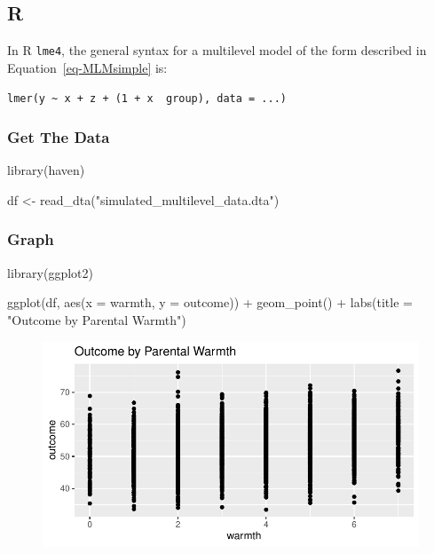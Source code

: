 \documentclass[
  letterpaper,
  DIV=11,
  numbers=noendperiod,
  oneside]{scrreprt}
\newenvironment{Shaded}{\begin{snugshade}}{\end{snugshade}}
\newcommand{\AttributeTok}[1]{\textcolor[rgb]{0.40,0.45,0.13}{#1}}
\newcommand{\FunctionTok}[1]{\textcolor[rgb]{0.28,0.35,0.67}{#1}}
\newcommand{\NormalTok}[1]{\textcolor[rgb]{0.00,0.23,0.31}{#1}}
\newcommand{\OtherTok}[1]{\textcolor[rgb]{0.00,0.23,0.31}{#1}}
\newcommand{\SpecialCharTok}[1]{\textcolor[rgb]{0.37,0.37,0.37}{#1}}
\newcommand{\StringTok}[1]{\textcolor[rgb]{0.13,0.47,0.30}{#1}}
\begin{document}
\subsection{R}

In R \texttt{lme4}, the general syntax for a multilevel model of the
form described in Equation~\ref{eq-MLMsimple} is:

\texttt{lmer(y\ \textasciitilde{}\ x\ +\ z\ +\ (1\ +\ x\ \textbar{}\textbar{}\ group),\ data\ =\ ...)}

\hypertarget{get-the-data-1}{%
\subsubsection{Get The Data}\label{get-the-data-1}}

\begin{Shaded}
\begin{Highlighting}[]
\FunctionTok{library}\NormalTok{(haven)}

\NormalTok{df }\OtherTok{\textless{}{-}} \FunctionTok{read\_dta}\NormalTok{(}\StringTok{"simulated\_multilevel\_data.dta"}\NormalTok{)}
\end{Highlighting}
\end{Shaded}

\hypertarget{graph-1}{%
\subsubsection{Graph}\label{graph-1}}

\begin{Shaded}
\begin{Highlighting}[]
\FunctionTok{library}\NormalTok{(ggplot2)}

\FunctionTok{ggplot}\NormalTok{(df,}
       \FunctionTok{aes}\NormalTok{(}\AttributeTok{x =}\NormalTok{ warmth,}
           \AttributeTok{y =}\NormalTok{ outcome)) }\SpecialCharTok{+}
  \FunctionTok{geom\_point}\NormalTok{() }\SpecialCharTok{+}
  \FunctionTok{labs}\NormalTok{(}\AttributeTok{title =} \StringTok{"Outcome by Parental Warmth"}\NormalTok{)}
\end{Highlighting}
\end{Shaded}

\begin{figure}[H]

{\centering \includegraphics{index_files/figure-pdf/unnamed-chunk-11-1.pdf}

}

\end{figure}
\end{document}
